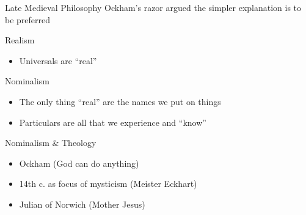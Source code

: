    {
    \begin{frame}[plain]
    \end{frame}
    }






\begin{frame}[label=sec-2-4]{Late Medieval Philosophy}
Ockham's razor argued the simpler explanation is to be preferred
\begin{block}{Realism}
\begin{itemize}
\item Universals are ``real''
\end{itemize}
\end{block}

\begin{block}{Nominalism}
\begin{itemize}
\item The only thing ``real'' are the names we put on things
\item Particulars are all that we experience and ``know''
\end{itemize}
\end{block}
\end{frame}

\begin{frame}[label=sec-2-5]{Nominalism \& Theology}
\begin{itemize}
\item Ockham (God can do anything)
\item 14th c. as focus of mysticism (Meister Eckhart)
\item Julian of Norwich (Mother Jesus)
\end{itemize}
\end{frame}

